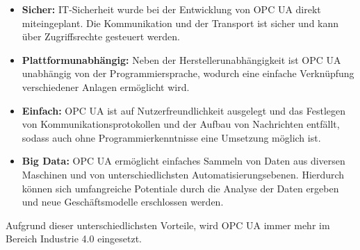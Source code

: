 \documentclass[ a4paper,
                oneside,
                toc=bibliography,
                toc=listof
                ]{scrbook}
\begin{document}
   	\begin{itemize}
   		\item \textbf{Sicher:} IT-Sicherheit wurde bei der Entwicklung von OPC UA direkt miteingeplant. Die Kommunikation und der Transport ist sicher und kann über Zugriffsrechte gesteuert werden.
   		\item \textbf{Plattformunabhängig:} Neben der Herstellerunabhängigkeit ist OPC UA unabhängig von der Programmiersprache, wodurch eine einfache Verknüpfung verschiedener Anlagen ermöglicht wird.
   		\item \textbf{Einfach:} OPC UA ist auf Nutzerfreundlichkeit ausgelegt und das Festlegen von Kommunikationsprotokollen und der Aufbau von Nachrichten entfällt, sodass auch ohne Programmierkenntnisse eine Umsetzung möglich ist. 
   		\item \textbf{Big Data:} OPC UA ermöglicht einfaches Sammeln von Daten aus diversen Maschinen und von unterschiedlichsten Automatisierungsebenen. Hierdurch können sich umfangreiche Potentiale durch die Analyse der Daten ergeben und neue Geschäftsmodelle erschlossen werden. \\
   	\end{itemize}
   	Aufgrund dieser unterschiedlichsten Vorteile, wird OPC UA immer mehr im Bereich Industrie 4.0 eingesetzt. \cite{OPCUA}  \cite{industrie40}
	\clearpage
\end{document}
